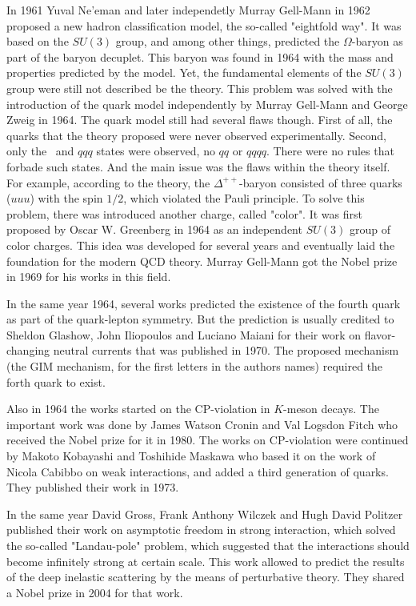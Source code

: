 In 1961 Yuval Ne'eman and later independetly Murray Gell-Mann in 1962 proposed a new hadron classification model, the so-called "eightfold way". It was based on the $SU(3)$ group, and among other things, predicted the $\Omega$-baryon as part of the baryon decuplet. This baryon was found in 1964 with the mass and properties predicted by the model. Yet, the fundamental elements of the $SU(3)$ group were still not described be the theory. This problem was solved with the introduction of the quark model independently by Murray Gell-Mann and George Zweig in 1964. The quark model still had several flaws though. First of all, the quarks that the theory proposed were never observed experimentally. Second, only the \qqbar\ and $qqq$ states were observed, no $qq$ or $qqqq$. There were no rules that forbade such states. And the main issue was the flaws within the theory itself. For example, according to the theory, the $\Delta^{++}$-baryon consisted of three quarks ($uuu$) with the spin $1/2$, which violated the Pauli principle. To solve this problem, there was introduced another charge, called "color". It was first proposed by Oscar W. Greenberg in 1964 as an independent $SU(3)$ group of color charges. This idea was developed for several years and eventually laid the foundation for the modern QCD theory. Murray Gell-Mann got the Nobel prize in 1969 for his works in this field.

In the same year 1964, several works predicted the existence of the fourth quark as part of the quark-lepton symmetry. But the prediction is usually credited to Sheldon Glashow, John Iliopoulos and Luciano Maiani for their work on flavor-changing neutral currents that was published in 1970. The proposed mechanism (the GIM mechanism, for the first letters in the authors names) required the forth quark to exist.

Also in 1964 the works started on the CP-violation in $K$-meson decays. The important work was done by James Watson Cronin and Val Logsdon Fitch who received the Nobel prize for it in 1980. The works on CP-violation were continued by Makoto Kobayashi and Toshihide Maskawa who based it on the work of Nicola Cabibbo on weak interactions, and added a third generation of quarks. They published their work in 1973.

In the same year David Gross, Frank Anthony Wilczek and Hugh David Politzer published their work on asymptotic freedom in strong interaction, which solved the so-called "Landau-pole" problem, which suggested that the interactions should become infinitely strong at certain scale. This work allowed to predict the results of the deep inelastic scattering by the means of perturbative theory. They shared a Nobel prize in 2004 for that work.

